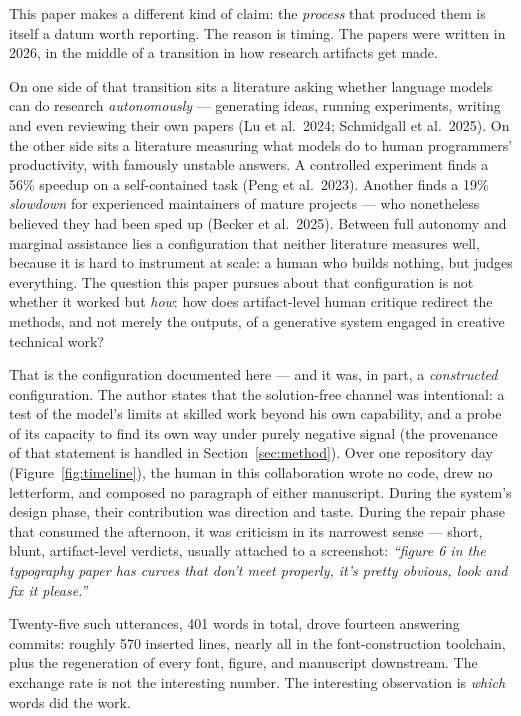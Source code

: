 \documentclass[12pt]{article}
\begin{document}
This paper makes a different kind of claim: the \emph{process} that produced them is itself a datum worth reporting. The reason is timing. The papers were written in 2026, in the middle of a transition in how research artifacts get made.

On one side of that transition sits a literature asking whether language models can do research \emph{autonomously} — generating ideas, running experiments, writing and even reviewing their own papers (Lu et al.\ 2024; Schmidgall et al.\ 2025). On the other side sits a literature measuring what models do to human programmers' productivity, with famously unstable answers. A controlled experiment finds a 56\% speedup on a self-contained task (Peng et al.\ 2023). Another finds a 19\% \emph{slowdown} for experienced maintainers of mature projects — who nonetheless believed they had been sped up (Becker et al.\ 2025). Between full autonomy and marginal assistance lies a configuration that neither literature measures well, because it is hard to instrument at scale: a human who builds nothing, but judges everything. The question this paper pursues about that configuration is not whether it worked but \emph{how}: how does artifact-level human critique redirect the methods, and not merely the outputs, of a generative system engaged in creative technical work?

That is the configuration documented here — and it was, in part, a \emph{constructed} configuration. The author states that the solution-free channel was intentional: a test of the model's limits at skilled work beyond his own capability, and a probe of its capacity to find its own way under purely negative signal (the provenance of that statement is handled in Section~\ref{sec:method}). Over one repository day (Figure~\ref{fig:timeline}), the human in this collaboration wrote no code, drew no letterform, and composed no paragraph of either manuscript. During the system's design phase, their contribution was direction and taste. During the repair phase that consumed the afternoon, it was criticism in its narrowest sense — short, blunt, artifact-level verdicts, usually attached to a screenshot: \emph{``figure 6 in the typography paper has curves that don't meet properly, it's pretty obvious, look and fix it please.''}

Twenty-five such utterances, 401 words in total, drove fourteen answering commits: roughly 570 inserted lines, nearly all in the font-construction toolchain, plus the regeneration of every font, figure, and manuscript downstream. The exchange rate is not the interesting number. The interesting observation is \emph{which} words did the work.
\end{document}

